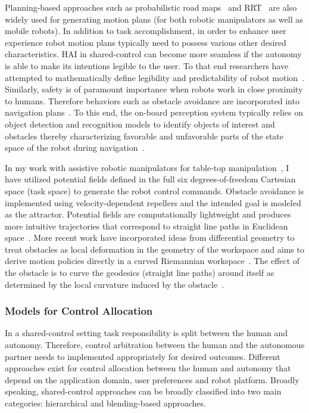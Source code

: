 \documentclass[12pt]{article}
\begin{document}
Planning-based approaches such as probabilistic road maps~\cite{kavraki1996analysis} and RRT~\cite{kuffner2000rrt} are also widely used for generating motion plans (for both robotic manipulators as well as mobile robots). In addition to task accomplishment, in order to enhance user experience robot motion plans typically need to possess various other desired characteristics. HAI in shared-control can become more seamless if the autonomy is able to make its intentions legible to the user. To that end researchers have attempted to mathematically define legibility and predictability of robot motion~\cite{dragan2013legibility}. Similarly, safety is of paramount importance when robots work in close proximity to humans. Therefore behaviors such as obstacle avoidance are incorporated into navigation plans~\cite{storms2014blending}. To this end, the on-board perception system typically relies on object detection and recognition models to identify objects of interest and obstacles thereby characterizing favorable and unfavorable parts of the state space of the robot during navigation~\cite{muller2006off}.

 In my work with assistive robotic manipulators for table-top manipulation~\cite{gopinath2017human}, I have utilized potential fields defined in the full six degrees-of-freedom Cartesian space (task space) to generate the robot control commands. Obstacle avoidance is implemented using velocity-dependent repellers and the intended goal is modeled as the attractor. Potential fields are computationally lightweight and produces more intuitive trajectories that correspond to straight line paths in Euclidean space~\cite{khatib1986real}. More recent work have incorporated ideas from differential geometry to treat obstacles as local deformation in the geometry of the workspace and aims to derive motion policies directly in a curved Riemannian workspace~\cite{ratliff2018riemannian}. The effect of the obstacle is to curve the geodesics (straight line paths) around itself as determined by the local curvature induced by the obstacle~\cite{mainprice2016warping}. 
\subsubsection{Models for Control Allocation}

In a shared-control setting task responsibility is split between the human and autonomy. Therefore, control arbitration between the human and the autonomous partner needs to implemented appropriately for desired outcomes. Different approaches exist for control allocation between the human and autonomy that depend on the application domain, user preferences and robot platform. 
Broadly speaking, shared-control approaches can be broadly classified into two main categories: hierarchical and blending-based approaches.
\end{document}
